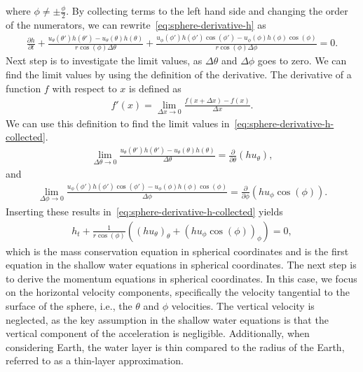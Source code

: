 where $\phi \neq \pm \frac{\phi}{2}$.
By collecting terms to the left hand side and changing the order of the numerators, we can rewrite~\eqref{eq:sphere-derivative-h} as 
\begin{align}\label{eq:sphere-derivative-h-collected}
    \frac{\partial h}{\partial t} + \frac{u_\theta(\theta') h(\theta') - u_\theta(\theta)h(\theta) }{r \cos(\phi) \Delta \theta} 
    + \frac{u_\phi(\phi ')h(\phi ') \cos(\phi') - u_\phi(\phi) h(\phi) \cos(\phi) }{r \cos (\phi) \Delta \phi} = 0.
\end{align}
Next step is to investigate the limit values, as $\Delta \theta$ and $\Delta \phi$ goes to zero.
We can find the limit values by using the definition of the derivative.
The derivative of a function $f$ with respect to $x$ is defined as
\begin{align*}
    f'(x) = \lim_{\Delta x \to 0} \frac{f(x + \Delta x) - f(x)}{\Delta x}.
\end{align*}
We can use this definition to find the limit values in~\eqref{eq:sphere-derivative-h-collected}.
\begin{align*}
    \lim_{\Delta \theta \to 0} \frac{ u_\theta(\theta ')h(\theta ') - u_\theta(\theta) h(\theta) }{\Delta \theta} = \frac{\partial}{\partial \theta} (h u_\theta ),
\end{align*}
and 
\begin{align*}
    \lim_{\Delta \phi \to 0} \frac{ u_\phi(\phi ')h(\phi ') \cos(\phi') - u_\phi(\phi) h(\phi) \cos(\phi) }{\Delta \phi} =  \frac{\partial}{\partial \phi} (h u_\phi \cos(\phi)).
\end{align*}
Inserting these results in~\eqref{eq:sphere-derivative-h-collected} yields
\begin{align*}
    h_t + \frac{1}{r \cos (\phi)} \left( {(h u_\theta)}_{\theta} + {(h u_{\phi} \cos(\phi))}_{\phi}  \right) = 0,
\end{align*}
which is the mass conservation equation in spherical coordinates and is the first equation in the shallow water equations in spherical coordinates.
The next step is to derive the momentum equations in spherical coordinates.
In this case, we focus on the horizontal velocity components, specifically the velocity tangential to the surface of the sphere, i.e., the $\theta$ and $\phi$ velocities.
The vertical velocity is neglected, as the key assumption in the shallow water equations is that the vertical component of the acceleration is negligible.
Additionally, when considering Earth, the water layer is thin compared to the radius of the Earth, referred to as a thin-layer approximation.
